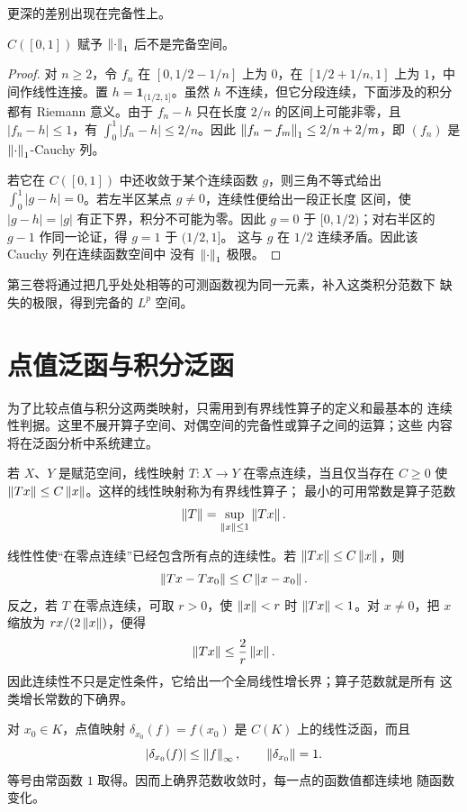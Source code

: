 更深的差别出现在完备性上。

\begin{proposition}
\label{prop:c-interval-not-complete-l1}
$C([0,1])$ 赋予 $\left\lVert\cdot\right\rVert_1$ 后不是完备空间。
\end{proposition}

\begin{proof}
对 $n\ge2$，令 $f_n$ 在 $[0,1/2-1/n]$ 上为 $0$，在
$[1/2+1/n,1]$ 上为 $1$，中间作线性连接。置
$h=\mathbf1_{(1/2,1]}$。虽然 $h$ 不连续，但它分段连续，下面涉及的积分
都有 Riemann 意义。由于 $f_n-h$ 只在长度 $2/n$ 的区间上可能非零，且
$|f_n-h|\le1$，有 $\int_0^1|f_n-h|\le2/n$。因此
$\left\lVert f_n-f_m\right\rVert_1\le2/n+2/m$，即 $(f_n)$ 是 $\left\lVert\cdot\right\rVert_1$-Cauchy 列。

若它在 $C([0,1])$ 中还收敛于某个连续函数 $g$，则三角不等式给出
$\int_0^1|g-h|=0$。若左半区某点 $g\ne0$，连续性便给出一段正长度
区间，使 $|g-h|=|g|$ 有正下界，积分不可能为零。因此 $g=0$ 于
$[0,1/2)$；对右半区的 $g-1$ 作同一论证，得 $g=1$ 于 $(1/2,1]$。
这与 $g$ 在 $1/2$ 连续矛盾。因此该 Cauchy 列在连续函数空间中
没有 $\left\lVert\cdot\right\rVert_1$ 极限。
\end{proof}

第三卷将通过把几乎处处相等的可测函数视为同一元素，补入这类积分范数下
缺失的极限，得到完备的 $L^p$ 空间。

\section{点值泛函与积分泛函}

为了比较点值与积分这两类映射，只需用到有界线性算子的定义和最基本的
连续性判据。这里不展开算子空间、对偶空间的完备性或算子之间的运算；这些
内容将在泛函分析中系统建立。

若 $X$、$Y$ 是赋范空间，线性映射 $T:X\to Y$ 在零点连续，当且仅当存在
$C\ge0$ 使 $\left\lVert Tx\right\rVert\le C\left\lVert x\right\rVert$。这样的线性映射称为有界线性算子；
最小的可用常数是算子范数
\[
 \left\lVert T\right\rVert=\sup_{\left\lVert x\right\rVert\le1}\left\lVert Tx\right\rVert.
\]

线性性使“在零点连续”已经包含所有点的连续性。若
$\left\lVert Tx\right\rVert\le C\left\lVert x\right\rVert$，则
\[
 \left\lVert Tx-Tx_0\right\rVert\le C\left\lVert x-x_0\right\rVert.
\]
反之，若 $T$ 在零点连续，可取 $r>0$，使 $\left\lVert x\right\rVert<r$ 时
$\left\lVert Tx\right\rVert<1$。对 $x\ne0$，把 $x$ 缩放为 $rx/(2\left\lVert x\right\rVert)$，便得
\[
 \left\lVert Tx\right\rVert\le\frac2r\left\lVert x\right\rVert.
\]
因此连续性不只是定性条件，它给出一个全局线性增长界；算子范数就是所有
这类增长常数的下确界。

对 $x_0\in K$，点值映射
$\delta_{x_0}(f)=f(x_0)$ 是 $C(K)$ 上的线性泛函，而且
\[
 |\delta_{x_0}(f)|\le\left\lVert f\right\rVert_\infty,
 \qquad \left\lVert\delta_{x_0}\right\rVert=1.
\]
等号由常函数 $1$ 取得。因而上确界范数收敛时，每一点的函数值都连续地
随函数变化。

